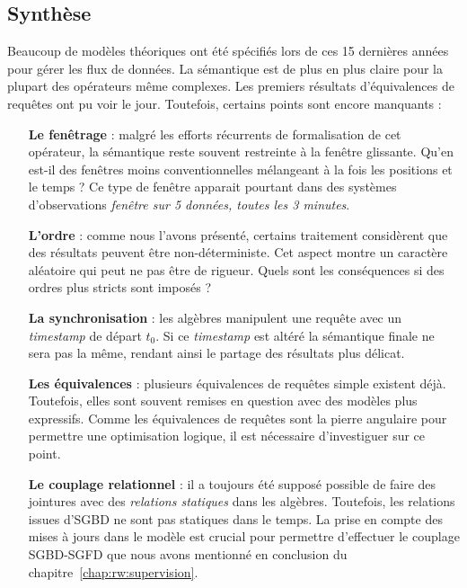 \subsection{Synthèse}
Beaucoup de modèles théoriques ont été spécifiés lors de ces 15 dernières années pour gérer les flux de données. La sémantique est de plus en plus claire pour la plupart des opérateurs même complexes. Les premiers résultats d'équivalences de requêtes ont pu voir le jour. Toutefois, certains points sont encore manquants :
\begin{itemize}
 \item[\textbf{Le fenêtrage}] : malgré les efforts récurrents de formalisation de cet opérateur, la sémantique reste souvent restreinte à la fenêtre glissante. Qu'en est-il des fenêtres moins conventionnelles mélangeant à la fois les positions et le temps ? Ce type de fenêtre apparait pourtant dans des systèmes d'observations \textit{fenêtre sur 5 données, toutes les 3 minutes}.
 \item[\textbf{L'ordre}] : comme nous l'avons présenté, certains traitement considèrent que des résultats peuvent être non-déterministe. Cet aspect montre un caractère aléatoire qui peut ne pas être de rigueur. Quels sont les conséquences si des ordres plus stricts sont imposés ?
 \item[\textbf{La synchronisation}] : les algèbres manipulent une requête avec un \textit{timestamp} de départ $t_0$. Si ce \textit{timestamp} est altéré la sémantique finale ne sera pas la même, rendant ainsi le partage des résultats plus délicat.
 \item[\textbf{Les équivalences}] : plusieurs équivalences de requêtes simple existent déjà. Toutefois, elles sont souvent remises en question avec des modèles plus expressifs. Comme les équivalences de requêtes sont la pierre angulaire pour permettre une optimisation logique, il est nécessaire d'investiguer sur ce point.
 \item[\textbf{Le couplage relationnel}] : il a toujours été supposé possible de faire des jointures avec des \textit{relations statiques} dans les algèbres. Toutefois, les relations issues d'SGBD ne sont pas statiques dans le temps. La prise en compte des mises à jours dans le modèle est crucial pour permettre d'effectuer le couplage SGBD-SGFD que nous avons mentionné en conclusion du chapitre~\ref{chap:rw:supervision}.
\end{itemize}


